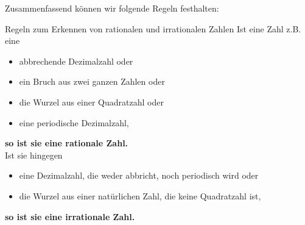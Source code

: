 Zusammenfassend können wir folgende Regeln festhalten:

\begin{law}{Regeln zum Erkennen von rationalen und irrationalen Zahlen}
	Ist eine Zahl z.B. eine
	\begin{itemize}\setlength\itemsep{0pt}
		\item abbrechende Dezimalzahl oder
		\item ein Bruch aus zwei ganzen Zahlen oder
		\item die Wurzel aus einer Quadratzahl oder
		\item eine periodische Dezimalzahl,
	\end{itemize}
	{\bfseries so ist sie eine rationale Zahl.}\\
	Ist sie hingegen
    \begin{itemize}\setlength\itemsep{0pt}
		\item eine Dezimalzahl, die weder abbricht, noch periodisch wird oder
		\item die Wurzel aus einer natürlichen Zahl, die keine Quadratzahl ist,
	\end{itemize}
	{\bfseries so ist sie eine irrationale Zahl.}\\
\end{law}

